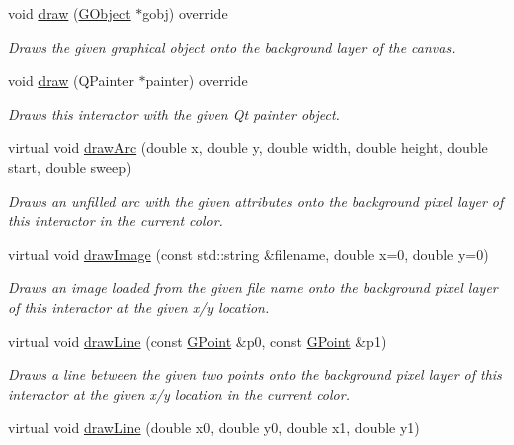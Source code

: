 \begin{DoxyCompactItemize}
void \mbox{\hyperlink{classsgl_1_1GCanvas_a7f7f6c1798bcedfd52151b458074e8a0}{draw}} (\mbox{\hyperlink{classsgl_1_1GObject}{G\+Object}} $\ast$gobj) override
\begin{DoxyCompactList}\small\item\em Draws the given graphical object onto the background layer of the canvas. \end{DoxyCompactList}\item 
void \mbox{\hyperlink{classsgl_1_1GCanvas_ab4536ea39f3b3899136554bdd5bda581}{draw}} (Q\+Painter $\ast$painter) override
\begin{DoxyCompactList}\small\item\em Draws this interactor with the given Qt painter object. \end{DoxyCompactList}\item 
virtual void \mbox{\hyperlink{classsgl_1_1GDrawingSurface_a38b6fae1045191c57092b49905068144}{draw\+Arc}} (double x, double y, double width, double height, double start, double sweep)
\begin{DoxyCompactList}\small\item\em Draws an unfilled arc with the given attributes onto the background pixel layer of this interactor in the current color. \end{DoxyCompactList}\item 
virtual void \mbox{\hyperlink{classsgl_1_1GDrawingSurface_abdd4cb1f2c64adc5d03522a1ee30febf}{draw\+Image}} (const std\+::string \&filename, double x=0, double y=0)
\begin{DoxyCompactList}\small\item\em Draws an image loaded from the given file name onto the background pixel layer of this interactor at the given x/y location. \end{DoxyCompactList}\item 
virtual void \mbox{\hyperlink{classsgl_1_1GDrawingSurface_ae6a24b6b9a6e795d3165c1c750d5bdf1}{draw\+Line}} (const \mbox{\hyperlink{structsgl_1_1GPoint}{G\+Point}} \&p0, const \mbox{\hyperlink{structsgl_1_1GPoint}{G\+Point}} \&p1)
\begin{DoxyCompactList}\small\item\em Draws a line between the given two points onto the background pixel layer of this interactor at the given x/y location in the current color. \end{DoxyCompactList}\item 
virtual void \mbox{\hyperlink{classsgl_1_1GDrawingSurface_aff299fe83178d2f3ce8c08c06b583484}{draw\+Line}} (double x0, double y0, double x1, double y1)

\end{DoxyCompactItemize}
